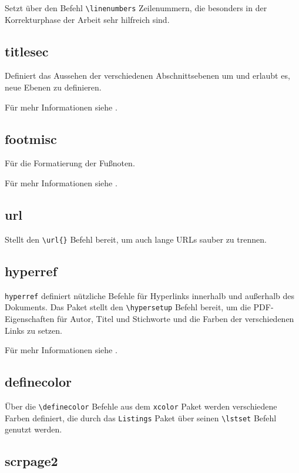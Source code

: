 Setzt über den Befehl \verb|\linenumbers| Zeilenummern, die besonders in der Korrekturphase der Arbeit sehr hilfreich sind.

\subsection{titlesec}

Definiert das Aussehen der verschiedenen Abschnittsebenen um und erlaubt es, neue Ebenen zu definieren.

Für mehr Informationen siehe \cite{titlesec}.

\subsection{footmisc}

Für die Formatierung der Fußnoten.

Für mehr Informationen siehe \cite{footmisc}.

\subsection{url}

Stellt den \verb|\url{}| Befehl bereit, um auch lange URLs sauber zu trennen.

\subsection{hyperref}

\texttt{hyperref} definiert nützliche Befehle für Hyperlinks innerhalb und außerhalb des Dokuments. Das Paket stellt den \verb|\hypersetup| Befehl bereit, um die PDF-Eigenschaften für Autor, Titel und Stichworte und die Farben der verschiedenen Links zu setzen. 

Für mehr Informationen siehe \cite{hyperref}.

\subsection{definecolor}

Über die \verb|\definecolor| Befehle aus dem \texttt{xcolor} Paket werden verschiedene Farben definiert, die durch das \texttt{Listings} Paket über seinen \verb|\lstset| Befehl genutzt werden.

\subsection{scrpage2}


